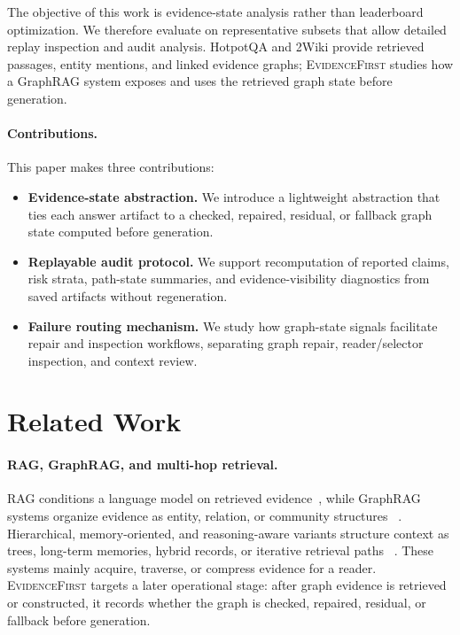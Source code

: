\documentclass[runningheads,a4paper]{llncs}
\newcommand{\sys}{\textsc{EvidenceFirst}\xspace}
\begin{document}
The objective of this work is evidence-state analysis rather than leaderboard
optimization. We therefore evaluate on representative subsets that allow
detailed replay inspection and audit analysis. HotpotQA and 2Wiki provide
retrieved passages, entity mentions, and linked evidence graphs; \sys studies
how a GraphRAG system exposes and uses the retrieved graph state before
generation.

\paragraph{Contributions.}
This paper makes three contributions:
\begin{itemize}
    \item \textbf{Evidence-state abstraction.} We introduce a lightweight
    abstraction that ties each answer artifact to a checked, repaired,
    residual, or fallback graph state computed before generation.
    \item \textbf{Replayable audit protocol.} We support recomputation of
    reported claims, risk strata, path-state summaries, and evidence-visibility
    diagnostics from saved artifacts without regeneration.
    \item \textbf{Failure routing mechanism.} We study how graph-state signals
    facilitate repair and inspection workflows, separating graph repair,
    reader/selector inspection, and context review.
\end{itemize}

\section{Related Work}
\label{sec:related}

\paragraph{RAG, GraphRAG, and multi-hop retrieval.}
RAG conditions a language model on retrieved evidence~\cite{lewis2020rag}, while
GraphRAG systems organize evidence as entity, relation, or community structures
~\cite{edge2024graphrag,guo2024lightrag,han2025graphragsurvey}. Hierarchical,
memory-oriented, and reasoning-aware variants structure context as trees,
long-term memories, hybrid records, or iterative retrieval paths
~\cite{sarthi2024raptor,gutierrez2024hipporag,li2024structrag,trivedi2022ircot,arag2026,yu2025hoprag}.
These systems mainly acquire, traverse, or compress evidence for a reader. \sys
targets a later operational stage: after graph evidence is retrieved or
constructed, it records whether the graph is checked, repaired, residual, or
fallback before generation.
\end{document}
